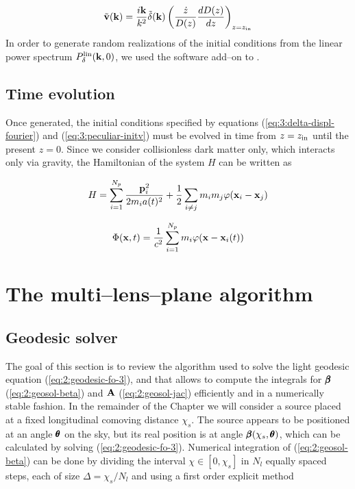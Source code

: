 \begin{equation}
\label{eq:3:peculiar-initv}
\tilde{\mathbf{v}}(\mathbf{k}) = \frac{i\mathbf{k}}{k^2}\tilde{\delta}(\mathbf{k})\left(\frac{\dot{z}}{D(z)}\frac{dD(z)}{dz}\right)_{z=z_{\rm in}}
\end{equation}  
%
In order to generate random realizations of the initial conditions from the linear power spectrum $P^{\rm lin}_\delta(\mathbf{k},0)$, we used the  software add--on to  \citep{gadget2}.   

\subsection{Time evolution}
Once generated, the initial conditions specified by equations (\ref{eq:3:delta-displ-fourier}) and (\ref{eq:3:peculiar-initv}) must be evolved in time from $z=z_{\rm in}$ until the present $z=0$. Since we consider collisionless dark matter only, which interacts only via gravity, the Hamiltonian of the system $H$ can be written as 

\begin{equation}
\label{eq:3:collisionless-ham}
H = \sum_{i=1}^{N_p} \frac{\mathbf{p}_i^2}{2m_i a(t)^2} + \frac{1}{2}\sum_{i\neq j}m_im_j\varphi(\mathbf{x}_i-\mathbf{x}_j)
\end{equation} 

\begin{equation}
\label{eq:3:macro-potential}
\Phi(\mathbf{x},t) = \frac{1}{c^2}\sum_{i=1}^{N_p} m_i\varphi(\mathbf{x}-\mathbf{x}_i(t))
\end{equation} 


\section{The multi--lens--plane algorithm}

\subsection{Geodesic solver}
The goal of this section is to review the algorithm used to solve the light geodesic equation (\ref{eq:2:geodesic-fo-3}), and that allows to compute the integrals for $\pmb{\beta}$ (\ref{eq:2:geosol-beta}) and $\mathbf{A}$ (\ref{eq:2:geosol-jac}) efficiently and in a numerically stable fashion. In the remainder of the Chapter we will consider a source placed at a fixed longitudinal comoving distance $\chi_s$. The source appears to be positioned at an angle $\pmb{\theta}$ on the sky, but its real position is at angle $\pmb{\beta}(\chi_s,\pmb{\theta})$, which can be calculated by solving (\ref{eq:2:geodesic-fo-3}). Numerical integration of (\ref{eq:2:geosol-beta}) can be done by dividing the interval $\chi\in[0,\chi_s]$ in $N_l$ equally spaced steps, each of size $\Delta = \chi_s/N_l$ and using a first order explicit method

